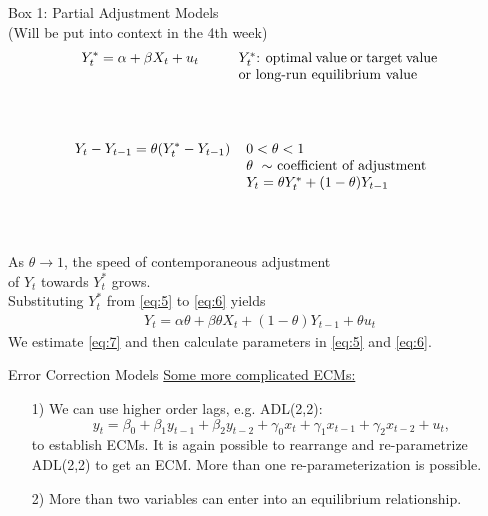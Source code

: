 \documentclass[usenames,dvipsnames]{beamer}
\begin{document}
\begin{frame}
\begin{block}{Box 1: Partial Adjustment Models \\ {\small (Will be put into context in the 4th week)}}
\small
\begin{align}\label{eq:5}
Y_t^{\ast} = \alpha + \beta X_t + u_t  \hspace*{10mm} \parbox[t][2cm][t]{5cm}{$Y_t^{\ast}$: optimal value or target value or long-run equilibrium value}
\end{align}
\vspace*{-1.5cm} 
\begin{align}\label{eq:6}
Y_t - Y_{t-1} = \theta (Y_t^{\ast} - Y_{t-1})  \hspace*{4mm} \parbox[t][2cm][t]{5cm}{$0< \theta < 1$ \\ $\theta \,\, \sim$ coefficient of adjustment \\ $Y_t = \theta Y_t^{\ast} + (1-\theta) Y_{t-1}$}
\end{align}
\vspace*{-1.2cm} 
\\\hspace*{5.1mm}As $\theta \rightarrow 1$, the speed of contemporaneous adjustment \\ \hspace*{5.1mm}of $Y_t$ towards $Y_t^{\ast}$ grows. \\
\vspace*{.5cm} 
\hspace*{5.1mm}Substituting $Y_t^{\ast}$ from \eqref{eq:5} to \eqref{eq:6} yields
\begin{align}\label{eq:7}
Y_t = \alpha \theta + \beta \theta X_t + (1-\theta) Y_{t-1} + \theta u_t
\end{align}
We estimate \eqref{eq:7} and then calculate parameters in \eqref{eq:5} and \eqref{eq:6}.
\end{block}
\end{frame}


\begin{frame}{Error Correction Models}
\underline{Some more complicated ECMs:}\\
\bigskip
\begin{itemize}
\item[1)] We can use higher order lags, e.g. ADL(2,2):
$$y_t = \beta_0 + \beta_1 y_{t-1} + \beta_2 y_{t-2} +
         \gamma_0 x_t + \gamma_1 x_{t-1} + \gamma_2 x_{t-2} + u_t,$$
to establish ECMs. It is again possible to rearrange and re-parametrize ADL(2,2) to get an ECM. More than one re-parameterization is possible.\\
\bigskip
\item[2)] More than two variables can enter into an equilibrium relationship. 
\end{itemize}
\end{frame}

\end{document}
